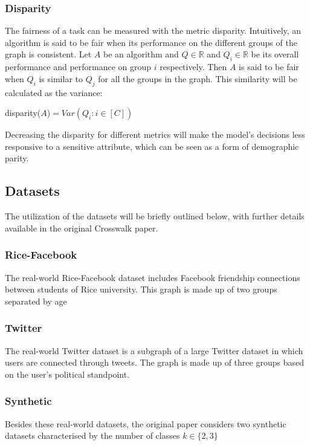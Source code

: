 \subsubsection{Disparity} The fairness of a task can be measured with the metric disparity. Intuitively, an algorithm is said to be fair when its performance on the different groups of the graph is consistent. Let $A$ be an algorithm and $Q\in \mathbb{R}$ and $Q_i\in \mathbb{R}$ be its overall performance and performance on group $i$ respectively. Then $A$ is said to be fair when $Q_i$ is similar to $Q_j$ for all the groups in the graph. This similarity will be calculated as the variance:\\

\begin{center}
disparity($A$)$=Var({Q_i}:i\in[C])$
\end{center}

Decreasing the disparity for different metrics will make the model's decisions less responsive to a sensitive attribute, which can be seen as a form of demographic parity. \cite{Hardt}
\subsection{Datasets}
The utilization of the datasets will be briefly outlined below, with further details available in the original Crosswalk paper.
\subsubsection{Rice-Facebook} The real-world Rice-Facebook dataset \cite{mislove2010you} includes Facebook friendship connections between students of Rice university. This graph is made up of two groups separated by age 
\subsubsection{Twitter} The real-world Twitter dataset is a subgraph of a large Twitter dataset \cite{Twitter} in which users are connected through tweets. The graph is made up of three groups based on the user's political standpoint. 
\subsubsection{Synthetic} Besides these real-world datasets, the original paper considers two synthetic datasets characterised by the number of classes $k\in\{2,3\}$

